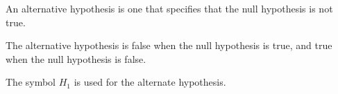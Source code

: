 An alternative hypothesis is one that specifies that the null hypothesis is not true. 
\par
The alternative hypothesis is false when the null hypothesis is true, and true when the null hypothesis is false.
\par
The symbol $H_{1}$  is used for the alternate hypothesis.